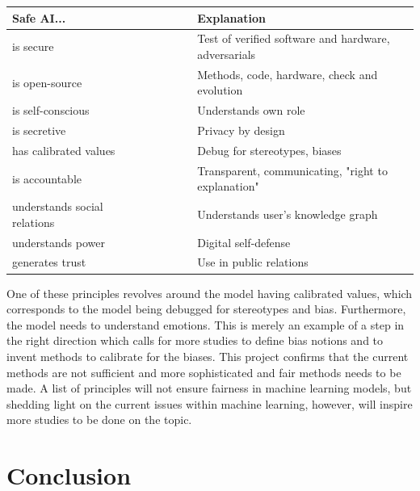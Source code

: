 \documentclass[11pt, fleqn, titlepage]{article}
\begin{document}
	\begin{table}[H]
		\centering
		\begin{tabular}{l  l  l l l  l  l}
			\toprule
			\textbf{Safe AI... }                & & & & & & \textbf{Explanation} \\ \midrule
			is secure                     & & & & & & Test of verified software and hardware, adversarials \\
			is open-source                & & & & & & Methods, code, hardware, check and evolution         \\
			is self-conscious             & & & & & & Understands own role                                 \\
			is secretive                  & & & & & & Privacy by design                                    \\
			has calibrated values      & & & & & & Debug for stereotypes, biases                        \\
			is accountable             & & & & & & Transparent, communicating, "right to explanation"   \\
			understands social relations& & & & & & Understands user's knowledge graph                   \\
			understands power          & & & & & & Digital self-defense                                 \\
			generates trust            & & & & & & Use in public relations                              \\ \bottomrule
		\end{tabular}
	\end{table} 

	\noindent
	One of these principles revolves around the model having calibrated values, which corresponds to the model being debugged for stereotypes and bias. Furthermore, the model needs to understand emotions. This is merely an example of a step in the right direction which calls for more studies to define bias notions and to invent methods to calibrate for the biases. This project confirms that the current methods are not sufficient and more sophisticated and fair methods needs to be made. A list of principles will not ensure fairness in machine learning models, but shedding light on the current issues within machine learning, however, will inspire more studies to be done on the topic.
	

	
	\section{Conclusion} \label{conclusion}
	
\end{document}
